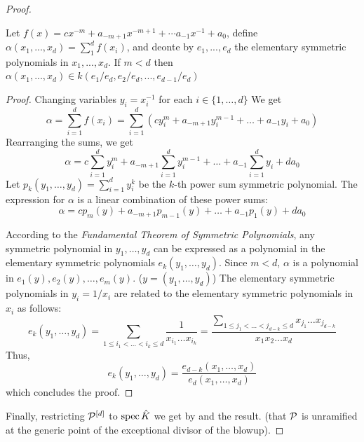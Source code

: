 \begin{proof}
     \begin{lemma}
          Let $f(x) = c x^{-m} + a_{-m + 1} x^{-m + 1} + \cdots a_{-1}x^{-1} + a_0$, 
          define  $\alpha(x_1, ..., x_d) = \sum_1^d f(x_i)$, and deonte by $e_1, ..., e_d$ the elementary symmetric polynomials 
          in $x_1, ..., x_d$. If $m < d$ then $\alpha(x_1, ..., x_d) \in k(e_1/e_d, e_2/e_d, ..., e_{d-1}/e_d)$
     \end{lemma}
     \begin{proof}
          Changing variables $y_i=x_i^{-1}$ for each $i \in \{1, \dots, d\}$
          We get 
          $$\alpha = \sum_{i=1}^d f(x_i) = \sum_{i=1}^d \left( c y_i^m + a_{-m+1} y_i^{m-1} + \dots + a_{-1} y_i + a_0 \right)$$
          Rearranging the sums, we get
          $$\alpha = c \sum_{i=1}^d y_i^m + a_{-m+1} \sum_{i=1}^d y_i^{m-1} + \dots + a_{-1} \sum_{i=1}^d y_i + d a_0$$
          Let $p_k(y_1, \dots, y_d) = \sum_{i=1}^d y_i^k$ be the $k$-th power sum symmetric polynomial. 
          The expression for $\alpha$ is a linear combination of these power sums:
          $$\alpha = c p_m(y) + a_{-m+1} p_{m-1}(y) + \dots + a_{-1} p_1(y) + d a_0$$
         
          According to the \textit{Fundamental Theorem of Symmetric Polynomials}, any symmetric polynomial in $y_1, \dots, y_d$ 
          can be expressed as a polynomial in the elementary symmetric polynomials $e_k(y_1, \dots, y_d)$. 
          Since $m < d$, $\alpha$ is a polynomial in $e_1(y), e_2(y), \dots, e_m(y)$. ($y=(y_1, \dots, y_d)$)
          The elementary symmetric polynomials in $y_i = 1/x_i$ are related to the elementary symmetric polynomials in $x_i$ as follows: 
          $$e_k(y_1, \dots, y_d) = \sum_{1 \le i_1 < \dots < i_k \le d} \frac{1}{x_{i_1} \dots x_{i_k}} = \frac{\sum_{1 \le j_1 < \dots < j_{d-k} \le d} x_{j_1} \dots x_{j_{d-k}}}{x_1 x_2 \dots x_d}$$
          Thus,
          $$e_k(y_1, \dots, y_d) = \frac{e_{d-k}(x_1, \dots, x_d)}{e_d(x_1, \dots, x_d)}$$
          which concludes the proof.
     \end{proof}

Finally, restricting $\mathcal{P}^{[d]}$ to $\operatorname{spec} {\hat{K}}$ we get by 
and  the result. (that $\mathcal{P}$ is unramified at the generic point of the exceptional divisor of the blowup).


\end{proof}
